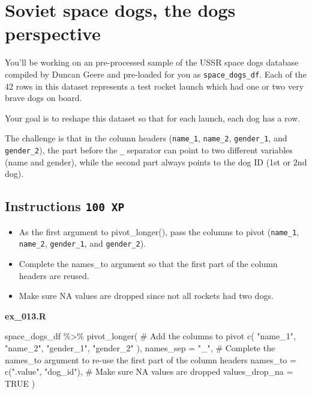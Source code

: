 \documentclass[
  letterpaper,
  DIV=11,
  numbers=noendperiod]{scrreprt}
\newenvironment{Shaded}{\begin{snugshade}}{\end{snugshade}}
\newcommand{\AttributeTok}[1]{\textcolor[rgb]{0.40,0.45,0.13}{#1}}
\newcommand{\CommentTok}[1]{\textcolor[rgb]{0.37,0.37,0.37}{#1}}
\newcommand{\ConstantTok}[1]{\textcolor[rgb]{0.56,0.35,0.01}{#1}}
\newcommand{\FunctionTok}[1]{\textcolor[rgb]{0.28,0.35,0.67}{#1}}
\newcommand{\NormalTok}[1]{\textcolor[rgb]{0.00,0.23,0.31}{#1}}
\newcommand{\SpecialCharTok}[1]{\textcolor[rgb]{0.37,0.37,0.37}{#1}}
\newcommand{\StringTok}[1]{\textcolor[rgb]{0.13,0.47,0.30}{#1}}
\providecommand{\tightlist}{%
  \setlength{\itemsep}{0pt}\setlength{\parskip}{0pt}}\usepackage{longtable,booktabs,array}
\begin{document}
\hypertarget{soviet-space-dogs-the-dogs-perspective}{%
\section{Soviet space dogs, the dogs
perspective}\label{soviet-space-dogs-the-dogs-perspective}}

You'll be working on an pre-processed sample of the USSR space dogs
database compiled by Duncan Geere and pre-loaded for you as
\texttt{space\_dogs\_df}. Each of the 42 rows in this dataset represents
a test rocket launch which had one or two very brave dogs on board.

Your goal is to reshape this dataset so that for each launch, each dog
has a row.

The challenge is that in the column headers (\texttt{name\_1},
\texttt{name\_2}, \texttt{gender\_1}, and \texttt{gender\_2}), the part
before the \texttt{\_} separator can point to two different variables
(name and gender), while the second part always points to the dog ID
(1st or 2nd dog).

\hypertarget{instructions-100-xp-10}{%
\subsection*{\texorpdfstring{Instructions
\texttt{100\ XP}}{Instructions 100 XP}}\label{instructions-100-xp-10}}

\begin{itemize}
\tightlist
\item
  As the first argument to pivot\_longer(), pass the columns to pivot
  (\texttt{name\_1}, \texttt{name\_2}, \texttt{gender\_1}, and
  \texttt{gender\_2}).
\item
  Complete the names\_to argument so that the first part of the column
  headers are reused.
\item
  Make sure NA values are dropped since not all rockets had two dogs.
\end{itemize}

\textbf{ex\_013.R}

\begin{Shaded}
\begin{Highlighting}[]
\NormalTok{space\_dogs\_df }\SpecialCharTok{\%\textgreater{}\%} 
  \FunctionTok{pivot\_longer}\NormalTok{(}
    \CommentTok{\# Add the columns to pivot}
    \FunctionTok{c}\NormalTok{(}
      \StringTok{"name\_1"}\NormalTok{,}
      \StringTok{"name\_2"}\NormalTok{,}
      \StringTok{"gender\_1"}\NormalTok{,}
      \StringTok{"gender\_2"}
\NormalTok{    ),}
    \AttributeTok{names\_sep =} \StringTok{"\_"}\NormalTok{,}
    \CommentTok{\# Complete the names\_to argument to re{-}use the first part of the column headers}
    \AttributeTok{names\_to =} \FunctionTok{c}\NormalTok{(}\StringTok{".value"}\NormalTok{,  }\StringTok{"dog\_id"}\NormalTok{),}
    \CommentTok{\# Make sure NA values are dropped}
    \AttributeTok{values\_drop\_na =} \ConstantTok{TRUE}
\NormalTok{  )}
\end{Highlighting}
\end{Shaded}
\end{document}
